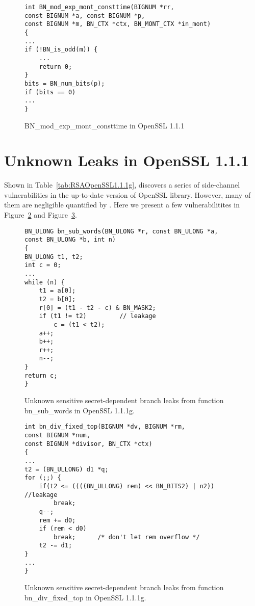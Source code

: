 \begin{figure}[h]
    \centering
    \begin{lstlisting}[xleftmargin=.02\textwidth,xrightmargin=.01\textwidth]
int BN_mod_exp_mont_consttime(BIGNUM *rr, 
const BIGNUM *a, const BIGNUM *p,
const BIGNUM *m, BN_CTX *ctx, BN_MONT_CTX *in_mont)
{
...
if (!BN_is_odd(m)) {
    ...
    return 0;
}
bits = BN_num_bits(p);
if (bits == 0) 
...
}
\end{lstlisting}
    \vspace*{-6pt}
    \caption{\textsf{BN\_mod\_exp\_mont\_consttime} in OpenSSL 1.1.1}
    \label{appen:fig:exp_new}
    \vspace*{-6pt}
\end{figure}

\section{Unknown Leaks in OpenSSL 1.1.1}\label{unknown:leak}
Shown in Table~\ref{tab:RSAOpenSSL1.1.1g}, \tool{} discovers a series
of side-channel vulnerabilities in the up-to-date version of OpenSSL library. 
However, many of them are negligible quantified by \tool{}.
Here we present a few vulnerabilitites in Figure~\ref{fig:unknown1} and Figure~\ref{fig:unknown2}. 

\begin{figure}[h]
\centering
\begin{lstlisting}[xleftmargin=.02\textwidth,xrightmargin=.01\textwidth]
BN_ULONG bn_sub_words(BN_ULONG *r, const BN_ULONG *a, 
const BN_ULONG *b, int n)
{
BN_ULONG t1, t2;
int c = 0;
... 
while (n) {
    t1 = a[0];
    t2 = b[0];
    r[0] = (t1 - t2 - c) & BN_MASK2;
    if (t1 != t2)         // leakage         
        c = (t1 < t2);
    a++;
    b++;
    r++;
    n--;
}
return c;
}
\end{lstlisting}
        \vspace*{-6pt}
        \caption{Unknown sensitive secret-dependent branch leaks from function 
                 \textsf{bn\_sub\_words} in OpenSSL 1.1.1g.}
        \label{fig:unknown1}
        \vspace*{-6pt}
 \end{figure}

\begin{figure}[h]
\centering
\begin{lstlisting}[xleftmargin=.02\textwidth,xrightmargin=.01\textwidth]
int bn_div_fixed_top(BIGNUM *dv, BIGNUM *rm, 
const BIGNUM *num,
const BIGNUM *divisor, BN_CTX *ctx)
{
... 
t2 = (BN_ULLONG) d1 *q;
for (;;) {
    if(t2 <= ((((BN_ULLONG) rem) << BN_BITS2) | n2)) //leakage
        break;
    q--;
    rem += d0;
    if (rem < d0)
        break;      /* don't let rem overflow */
    t2 -= d1;
}
... 
}
\end{lstlisting}
    \vspace*{-6pt}
    \caption{Unknown sensitive secret-dependent branch leaks from function 
             \textsf{bn\_div\_fixed\_top} in OpenSSL 1.1.1g.}
    \label{fig:unknown2}
    \vspace*{-6pt}
\end{figure}


